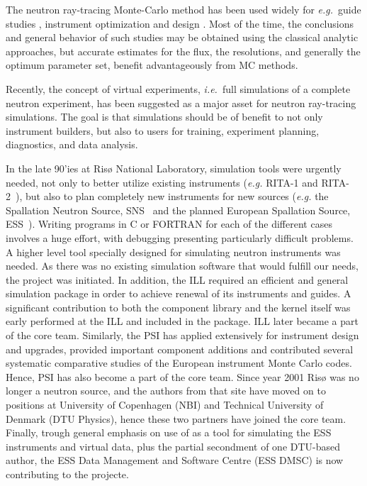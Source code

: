 The neutron ray-tracing Monte-Carlo method has been used widely for
{\em e.g.}\ guide studies \cite{Copley93,Farhi02,Schanzer04},
instrument optimization and design \cite{Zsigmond04,Lieutenant05}.
Most of the time, the conclusions and general behavior of such studies
may be obtained using the classical analytic approaches,
but accurate estimates for the flux, the resolutions,
and generally the optimum parameter set, benefit advantageously from MC methods.

Recently, the concept of virtual experiments, {\em i.e.}\ full simulations
of a complete neutron experiment, has been suggested as a major asset for neutron ray-tracing simulations. The goal is that
simulations should be of benefit to not only instrument builders, but also
to users for training, experiment planning, diagnostics, and data
analysis.

In the late 90'ies at Risø National Laboratory,
simulation tools were urgently needed,
not only to better utilize existing instruments
({\em e.g.} RITA-1 and RITA-2~\cite{cjp_73_697,pb_241_50,pb_283_343}),
but also to plan completely new instruments for new sources
({\em e.g.} the Spallation Neutron Source, SNS~\cite{sns_webpage}
and the planned European Spallation Source, ESS~\cite{ess_webpage}).
Writing programs in C or FORTRAN for
each of the different cases involves a huge effort, with debugging presenting
particularly difficult problems. A higher level tool specially designed
for simulating neutron instruments was needed. As there was
no existing simulation software that would fulfill our needs, the \MCS
project was initiated.
In addition, the ILL required an efficient and general simulation
package in order to achieve renewal of its instruments and guides.
A significant contribution to both the component library and the \MCS
kernel itself was early performed at the ILL and included in the package.
ILL later became a part of the core \MCS team.
Similarly, the PSI has applied \MCS extensively for instrument design
and upgrades, provided important component additions and contributed
several systematic comparative studies of the European instrument
Monte Carlo codes. Hence, PSI has also become a part of the core \MCS
team. 
Since year 2001 Risø was no longer a neutron source, and the authors
from that site have moved on to positions at University of Copenhagen
(NBI) and Technical University of Denmark (DTU Physics), hence these
two partners have joined the core \MCS team.
Finally, trough general emphasis on use of \MCS as a tool for
simulating the ESS instruments and virtual data, plus the partial
secondment of one DTU-based \MCS author, the ESS Data Management and
Software Centre (ESS DMSC) is now contributing to the projecte.

